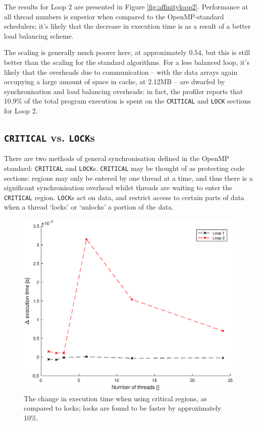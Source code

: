 \documentclass{article} %
\newcommand{\tp}{\texttt}
\begin{document}
The results for Loop 2 are presented in Figure \ref{fig:affinityloop2}.
Performance at all thread numbers is superior when compared to the OpenMP-standard schedulers;
it's likely that the decrease in execution time is as a result of a better load balancing scheme.

The scaling is generally much poorer here, at approximately $0.54$, but this is still better than the scaling for the standard algorithms.
For a less balanced loop, it's likely that the overheads due to communication -- with the data arrays again occupying a large amount of space in cache, at 2.12MB -- are dwarfed by synchronisation and load balancing overheads: in fact, the profiler reports that 10.9\% of the total program execution is spent on the \tp{CRITICAL} and \tp{LOCK} sections for Loop 2.

\subsection*{\tp{CRITICAL} vs. \tp{LOCK}s}\label{s:locks}

There are two methods of general synchronisation defined in the OpenMP standard: \tp{CRITICAL} and \tp{LOCK}s. 
\tp{CRITICAL} may be thought of as protecting code sections: regions may only be entered by one thread at a time, and thus there is a significant synchronisation overhead whilst threads are waiting to enter the \tp{CRITICAL} region.
\tp{LOCK}s act on data, and restrict access to certain parts of data when a thread `locks' or `unlocks' a portion of the data.


\begin{figure}
    \centering
    \includegraphics[height=.35\textheight]{part2_plots/criticalvslock}
    \caption{The change in execution time when using critical regions, as compared to locks; locks are found to be faster by approximately 10\%.}
    \label{fig:criticalvslock}
\end{figure}
\end{document}

